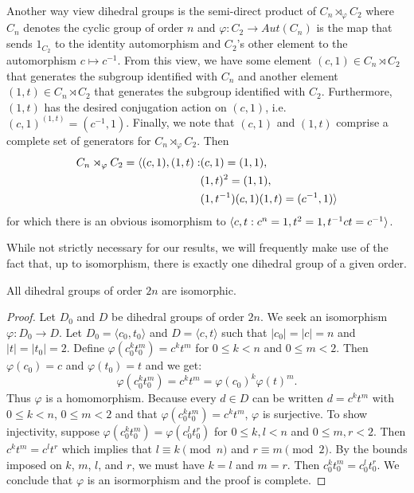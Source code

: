 \documentclass[main.tex]{subfiles}
\begin{document}
Another way view dihedral groups is the semi-direct product of $C_n \rtimes_\varphi C_2$ where $C_n$ denotes the cyclic group of order $n$ and $\varphi : C_2 \to Aut(C_n)$ is the map that sends $1_{C_2}$ to the identity automorphism and $C_2$'s other element to the automorphism $c \mapsto c^{-1}$. From this view, we have some element $(c, 1) \in C_n \rtimes C_2$ that generates the subgroup identified with $C_n$ and another element $(1, t) \in C_n \rtimes C_2$ that generates the subgroup identified with $C_2$. Furthermore, $(1, t)$ has the desired conjugation action on $(c, 1)$, i.e. $(c,1)^{(1,t)} = (c^{-1}, 1)$. Finally, we note that $(c, 1)$ and $(1, t)$ comprise a complete set of generators for $C_n \rtimes_\varphi C_2$. Then 
\begin{align*}
C_n \rtimes_\varphi C_2 = \langle (c, 1), (1, t) : &(c, 1) = (1, 1), \\
&(1, t)^2 = (1, 1), \\
&(1, t^{-1})(c, 1)(1, t) = (c^{-1}, 1) \rangle
\end{align*}
for which there is an obvious isomorphism to $\langle c, t : c^n = 1, t^2 = 1, t^{-1} c t = c^{-1} \rangle$.

\hss

While not strictly necessary for our results, we will frequently make use of the fact that, up to isomorphism, there is exactly one dihedral group of a given order.

\begin{theorem}
All dihedral groups of order $2n$ are isomorphic.
\end{theorem}

\begin{proof}
Let $D_0$ and $D$ be dihedral groups of order $2n$. We seek an isomorphism $\varphi: D_0 \to D$. Let $D_0 = \langle c_0, t_0 \rangle$ and $D = \langle c, t \rangle$ such that $|c_0| = |c| = n$ and $|t| = |t_0| = 2$. Define $\varphi(c_0^k t_0^m) = c^k t^m$ for $0 \le k < n$ and $0 \le m < 2$. Then $\varphi(c_0) = c$ and $\varphi(t_0) = t$ and we get:
$$\varphi(c_0^k t_0^m) = c^k t^m = \varphi(c_0)^k \varphi(t)^m \text{.}$$
Thus $\varphi$ is a homomorphism. Because every $d \in D$ can be written $d = c^k t^m$ with $0 \le k < n$, $0 \le m < 2$ and that $\varphi(c_0^k t_0^m) = c^k t^m$,  $\varphi$ is surjective. To show injectivity, suppose $\varphi(c_0^k t_0^m) = \varphi(c_0^l t_0^r)$ for $0 \le k, l < n$ and $0 \le m, r < 2$. Then $c^k t^m = c^l t^r$ which implies that $l \equiv k \pmod n$ and $r \equiv m \pmod 2$. By the bounds imposed on $k$, $m$, $l$, and $r$, we must have $k = l$ and $m = r$.  Then $c_0^k t_0^m = c_0^l t_0^r$. We conclude that $\varphi$ is an isormorphism and the proof is complete.
\end{proof}
\end{document}
